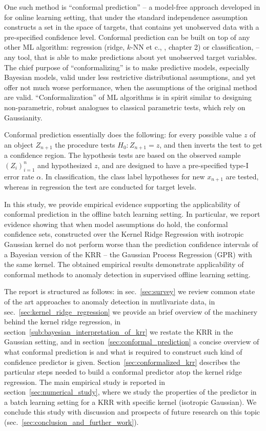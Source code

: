 \documentclass[a4paper,14pt]{extarticle}
\begin{document}
One such method is ``conformal prediction'' -- a model-free approach developed in
\cite{vovk2005} for online learning setting, that under the standard independence
assumption constructs a set in the space of targets, that contains yet unobserved
data with a pre-specified confidence level. Conformal prediction can be built on
top of any other ML algorithm: regression (ridge, $k$-NN et c., \cite{vovk2005},
chapter 2) or classification, -- any tool, that is able to make predictions about
yet unobserved target variables. The chief purpose of ``conformalizing'' is to make
predictive models, especially Bayesian models, valid under less restrictive distributional
assumptions, and yet offer not much worse performance, when the assumptions of the
original method are valid. ``Conformalization'' of ML algorithms is in spirit similar
to designing non-parametric, robust analogues to classical parametric tests, which
rely on Gaussianity.

Conformal prediction essentially does the following: for every possible value $z$
of an object $Z_{n+1}$ the procedure tests $H_0: Z_{n+1}=z$, and then inverts the
test to get a confidence region. The hypothesis tests are based on the observed sample
$(Z_i)_{i=1}^n$ and hypothesized $z$, and are designed to have a pre-specified type-I
error rate $\alpha$. In classification, the class label hypotheses for new $x_{n+1}$
are tested, whereas in regression the test are conducted for target levels.

In this study, we provide empirical evidence supporting the applicability of conformal
prediction in the offline batch learning setting. In particular, we report evidence
showing that when model assumptions do hold, the conformal confidence sets, constructed
over the Kernel Ridge Regression with isotropic Gaussian kernel do not perform worse
than the prediction confidence intervals of a Bayesian version of the KRR -- the
Gaussian Process Regression (GPR) with the same kernel. The obtained empirical results
demonstrate applicability of conformal methods to anomaly detection in supervised
offline learning setting.

The report is structured as follows: in sec.~\ref{sec:survey} we review common state
of the art approaches to anomaly detection in mutlivariate data, in sec.~\ref{sec:kernel_ridge_regression}
we provide an brief overview of the machinery behind the kernel ridge regression, in
section~\ref{sub:bayesian_interpretation_of_krr} we restate the KRR in the Gaussian
setting, and in section~\ref{sec:conformal_prediction} a concise overview of what
conformal prediction is and what is required to construct such kind of confidence
predictor is given. Section~\ref{sec:conformalized_krr} describes the particular
steps needed to build a conformal predictor atop the kernel ridge regression.
The main empirical study is reported in section~\ref{sec:numerical_study}, where
we study the properties of the predictor in a batch learning setting for a KRR
with specific kernel (isotropic Gaussian). We conclude this study with discussion
and prospects of future research on this topic (sec.~\ref{sec:conclusion_and_further_work}).
\end{document}
